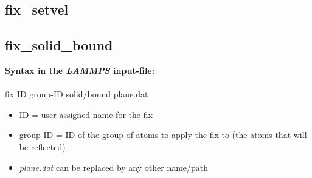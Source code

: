 \subsection{fix\_setvel}

\subsection{fix\_solid\_bound}
\label{sub:fix_solid_bound}

\textbf{Syntax in the \textit{LAMMPS} input-file:}\\
\\{ fix ID group-ID solid/bound plane.dat}
\begin{itemize}
\item ID = user-assigned name for the fix
\item group-ID = ID of the group of atoms to apply the fix to (the atoms that will be reflected)
\item \textit{plane.dat} can be replaced by any other name/path
\end{itemize}

